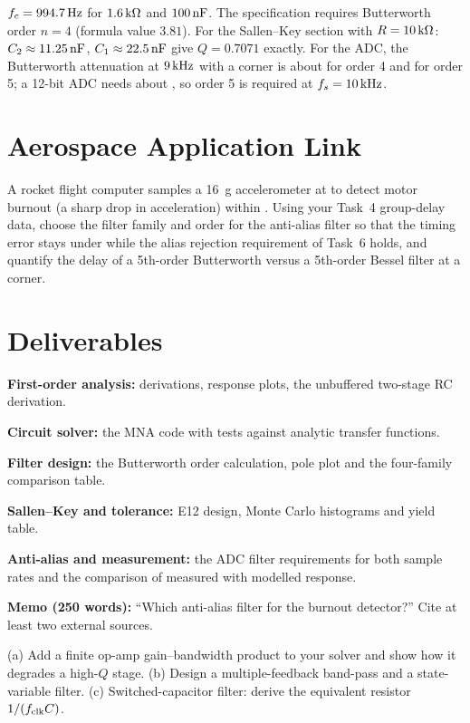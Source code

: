 \documentclass[11pt,a4paper]{article}
\begin{document}
\begin{checkpoint}
$f_c=\SI{994.7}{\hertz}$ for $\SI{1.6}{\kilo\ohm}$ and $\SI{100}{\nano\farad}$. The specification requires Butterworth order $n=4$ (formula value $3.81$). For the Sallen--Key section with $R=\SI{10}{\kilo\ohm}$: $C_2\approx\SI{11.25}{\nano\farad}$, $C_1\approx\SI{22.5}{\nano\farad}$ give $Q=0.7071$ exactly. For the ADC, the Butterworth attenuation at $\SI{9}{\kilo\hertz}$ with a  corner is about  for order 4 and  for order 5; a 12-bit ADC needs about , so order 5 is required at $f_s=\SI{10}{\kilo\hertz}$.
\end{checkpoint}

\section*{Aerospace Application Link}
A rocket flight computer samples a \SI{16}{g} accelerometer at  to detect motor burnout (a sharp drop in acceleration) within . Using your Task~4 group-delay data, choose the filter family and order for the anti-alias filter so that the timing error stays under  while the alias rejection requirement of Task~6 holds, and quantify the delay of a 5th-order Butterworth versus a 5th-order Bessel filter at a  corner.

\section*{Deliverables}
\begin{delivs}
  \item[D1] \textbf{First-order analysis:} derivations, response plots, the unbuffered two-stage RC derivation.
  \item[D2] \textbf{Circuit solver:} the MNA code with tests against analytic transfer functions.
  \item[D3] \textbf{Filter design:} the Butterworth order calculation, pole plot and the four-family comparison table.
  \item[D4] \textbf{Sallen--Key and tolerance:} E12 design, Monte Carlo histograms and yield table.
  \item[D5] \textbf{Anti-alias and measurement:} the ADC filter requirements for both sample rates and the comparison of measured with modelled response.
  \item[D6] \textbf{Memo (250 words):} ``Which anti-alias filter for the burnout detector?'' Cite at least two external sources.
  \item[Bonus] (a) Add a finite op-amp gain--bandwidth product to your solver and show how it degrades a high-$Q$ stage. (b) Design a multiple-feedback band-pass and a state-variable filter. (c) Switched-capacitor filter: derive the equivalent resistor $1/(f_{\rm clk}C)$.
\end{delivs}
\end{document}
